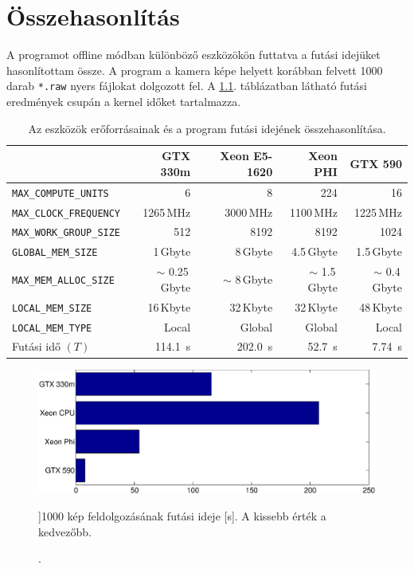 \chapter{Összehasonlítás}

	A programot offline módban különböző eszközökön futtatva a futási idejüket hasonlítottam össze.
	A program a kamera képe helyett korábban felvett 1000 darab \texttt{*.raw} nyers fájlokat dolgozott fel.
	A \ref{table:results}. táblázatban látható futási eredmények csupán a kernel időket tartalmazza.
	
	\begin{table}[H]
	\footnotesize
	\centering
	
	\setlength{\extrarowheight}{3pt}
	\begin{tabular}{ l | r | r | r | r}
		 & GTX 330m & Xeon E5-1620 & Xeon PHI & GTX 590\\ \hline
		\texttt{MAX\_COMPUTE\_UNITS} & 6 & 8 & 224 & 16\\
		\texttt{MAX\_CLOCK\_FREQUENCY} & 1265\,MHz & 3000\,MHz & 1100\,MHz & 1225\,MHz\\
		\texttt{MAX\_WORK\_GROUP\_SIZE} & 512 & 8192 & 8192 & 1024\\ \hline\hline
		\texttt{GLOBAL\_MEM\_SIZE} & 1\,Gbyte & 8\,Gbyte & 4.5\,Gbyte & 1.5\,Gbyte\\
		\texttt{MAX\_MEM\_ALLOC\_SIZE} & $\sim$ 0.25\,Gbyte & $\sim$ 8\,Gbyte & $\sim$ 1.5\,Gbyte & $\sim$ 0.4\,Gbyte\\
		\texttt{LOCAL\_MEM\_SIZE} & 16\,Kbyte & 32\,Kbyte & 32\,Kbyte & 48\,Kbyte\\
		\texttt{LOCAL\_MEM\_TYPE} & Local & Global & Global & Local\\\hline
		Futási idő $(T)$ & 114.1~s & 202.0~s & 52.7~s & 7.74~s
	\end{tabular}
	
	\caption[Különböző eszközök futási idejének összehasonlítása]{Az eszközök erőforrásainak és a program futási idejének összehasonlítása.}
	\label{table:results}
	\end{table}
	
	\begin{figure}[!h]
	\begin{center}
	  \includegraphics[width=0.9\columnwidth]{figures/eps/runtime.eps}
	  \caption[1000 kép feldolgozásának futási ideje [s].]{1000 kép feldolgozásának futási ideje [s]. A kissebb érték a kedvezőbb.}
	  \label{fig:runtime}
	\end{center}
	\end{figure}
	
